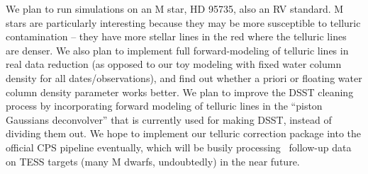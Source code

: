 We plan to run simulations on an M star, HD 95735, also an RV
standard. M stars are particularly interesting because they may be
more susceptible to telluric contamination -- they have more stellar
lines in the red where the telluric lines are denser. We also plan to
implement full forward-modeling of telluric lines in real data
reduction (as opposed to our toy modeling with fixed water column
density for all dates/observations), and find out whether a priori or
floating water column density parameter works better. We plan to
improve the DSST cleaning process by incorporating forward modeling of
telluric lines in the ``piston Gaussians deconvolver'' that is
currently used for making DSST, instead of dividing them out. We hope
to implement our telluric correction package into the official CPS
pipeline eventually, which will be busily processing \keck\ follow-up
data on TESS targets (many M dwarfs, undoubtedly) in the near future.
